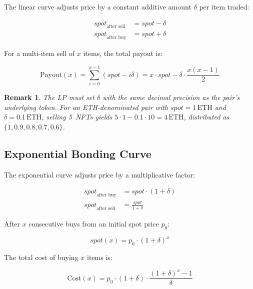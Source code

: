 \documentclass[11pt,a4paper]{article}
\newtheorem{remark}{Remark}[section]
\begin{document}
The linear curve adjusts price by a constant additive amount $\delta$
per item traded:

\begin{align}
\mathit{spot}_{\text{after sell}} &= \mathit{spot} - \delta
  \label{eq:linear-sell} \\
\mathit{spot}_{\text{after buy}} &= \mathit{spot} + \delta
  \label{eq:linear-buy}
\end{align}

For a multi-item sell of $x$ items, the total payout is:

\begin{equation}\label{eq:linear-multi}
\text{Payout}(x) = \sum_{i=0}^{x-1} (\mathit{spot} - i\delta)
= x \cdot \mathit{spot} - \delta \cdot \frac{x(x-1)}{2}
\end{equation}

\begin{remark}
The LP must set $\delta$ with the same decimal precision as the
pair's underlying token. For an ETH-denominated pair with
$\mathit{spot} = 1\,\text{ETH}$ and $\delta = 0.1\,\text{ETH}$,
selling 5~NFTs yields
$5 \cdot 1 - 0.1 \cdot 10 = 4\,\text{ETH}$, distributed as
$\{1, 0.9, 0.8, 0.7, 0.6\}$.
\end{remark}

\subsection{Exponential Bonding Curve}

The exponential curve adjusts price by a multiplicative factor:

\begin{align}
\mathit{spot}_{\text{after buy}} &= \mathit{spot} \cdot (1 + \delta)
  \label{eq:exp-buy} \\
\mathit{spot}_{\text{after sell}} &= \frac{\mathit{spot}}{1 + \delta}
  \label{eq:exp-sell}
\end{align}

After $x$ consecutive buys from an initial spot price $p_0$:

\begin{equation}\label{eq:exp-multi}
\mathit{spot}(x) = p_0 \cdot (1+\delta)^x
\end{equation}

The total cost of buying $x$ items is:

\begin{equation}
\text{Cost}(x) = p_0 \cdot (1+\delta) \cdot
\frac{(1+\delta)^x - 1}{\delta}
\end{equation}
\end{document}
